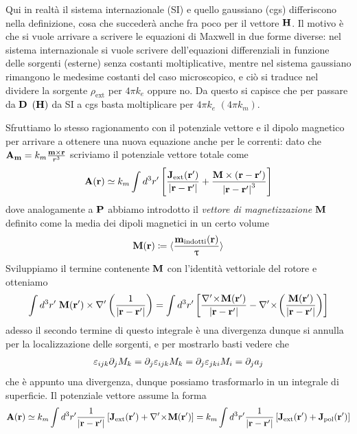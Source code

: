 Qui in realtà il sistema internazionale (SI) e quello gaussiano (cgs) differiscono nella definizione, cosa che succederà anche fra poco per il vettore 
$ \mathbf{H} $. Il motivo è che si vuole arrivare a scrivere le equazioni di Maxwell in due forme diverse: nel sistema internazionale si vuole scrivere 
dell'equazioni differenziali in funzione delle sorgenti (esterne) senza costanti moltiplicative, mentre nel sistema gaussiano rimangono le medesime 
costanti del caso microscopico, e ciò si traduce nel dividere la sorgente $ \rho_{\text{ext}} $ per $ 4\pi k_e $ oppure no. Da questo si capisce che per 
passare da $ \mathbf{D} $ $ (\mathbf{H}) $ da SI a cgs basta moltiplicare per $ 4\pi k_e $ $ (4\pi k_m) $.

Sfruttiamo lo stesso ragionamento con il potenziale vettore e il dipolo magnetico per arrivare a ottenere una nuova equazione anche per le correnti: dato
che $ \mathbf{A}_{\mathbf{m}} = k_m \frac{\mathbf{m}\times \mathbf{r}}{r^3} $ scriviamo il potenziale vettore totale come
\begin{align}
  \mathbf{A}(\mathbf{r}) \simeq k_m \int d^3r' \left[ \frac{\mathbf{J}_{\text{ext}}(\mathbf{r'})}{\mathbf{|r -r'|}} 
  + \frac{ \mathbf{M} \times \left( \mathbf{r - r'} \right)}{\mathbf{|r - r'|}^3} \right]
\end{align}
dove analogamente a $ \mathbf{P} $ abbiamo introdotto il \textit{vettore di magnetizzazione} $ \mathbf{M} $ definito come la media dei dipoli magnetici in un certo 
volume
\begin{align}
  \mathbf{M}(\mathbf{r}) \coloneq \langle \frac{\mathbf{m}_{\text{indotti}}(\mathbf{r})}{\uptau} \rangle
\end{align}
Sviluppiamo il termine contenente $ \mathbf{M} $ con l'identità vettoriale del rotore e otteniamo
\begin{align}
  \int d^3r'\; \mathbf{M}(\mathbf{r'}) \times \nabla' \left( \frac{1}{\mathbf{|r - r'|}} \right)
  = \int d^3 r' \left[ \frac{\nabla'\!\times\!\mathbf{ M }(\mathbf{r'})}{\mathbf{|r - r'|}} - \nabla'\!\times\!\left( \mathbf{ \frac{M(r')}{|r - r'|} }\right)\right]
\end{align}
adesso il secondo termine di questo integrale è una divergenza dunque si annulla per la localizzazione delle sorgenti, e per mostrarlo basti vedere che
\begin{align}
  \varepsilon_{i j k} \partial_j M_k = \partial_j \varepsilon_{i j k} M_k = \partial_j \varepsilon_{j k i} M_i = \partial_j a_j
\end{align}
che è appunto una divergenza, dunque possiamo trasformarlo in un integrale di superficie. Il potenziale vettore assume la forma
\begin{align}
  \mathbf{A}(\mathbf{r}) \simeq k_m \int d^3r' \frac{1}{\mathbf{|r - r'|}} \left[ \mathbf{J}_{\text{ext}}(\mathbf{r'}) + \nabla'\!\times\!\mathbf{ \mathbf{M}(r') } \right] 
  = k_m \int d^3r' \frac{1}{\mathbf{|r - r'|}} \left[ \mathbf{J}_{\text{ext}}(\mathbf{r'}) + \mathbf{J}_{\text{pol}}(\mathbf{r'}) \right] 
\end{align}
